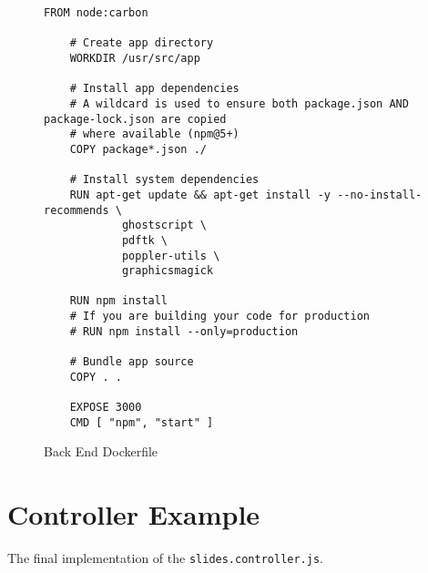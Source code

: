 \begin{figure}[h!]
    \begin{lstlisting}[basicstyle=\small, breaklines=true]
    FROM node:carbon

    # Create app directory
    WORKDIR /usr/src/app

    # Install app dependencies
    # A wildcard is used to ensure both package.json AND package-lock.json are copied
    # where available (npm@5+)
    COPY package*.json ./

    # Install system dependencies
    RUN apt-get update && apt-get install -y --no-install-recommends \
    		ghostscript \
    		pdftk \
    		poppler-utils \
    		graphicsmagick

    RUN npm install
    # If you are building your code for production
    # RUN npm install --only=production

    # Bundle app source
    COPY . .

    EXPOSE 3000
    CMD [ "npm", "start" ]
  \end{lstlisting}
  \caption{Back End Dockerfile}
  \label{sample:finalserverdocker}
\end{figure}

\newpage
\section{Controller Example}
The final implementation of the \texttt{slides.controller.js}.

